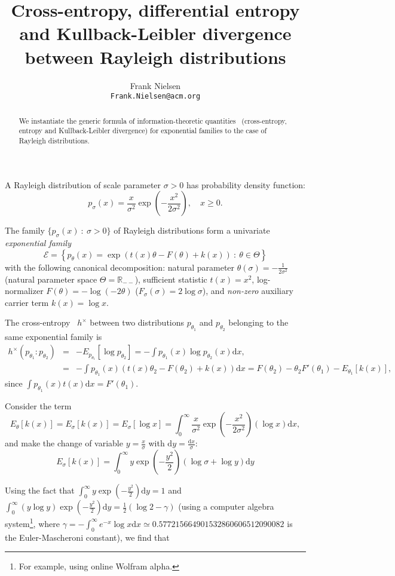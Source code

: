 \documentclass{article}
\title{Cross-entropy, differential entropy and Kullback-Leibler divergence between Rayleigh distributions}
\author{Frank Nielsen\\ {\tt Frank.Nielsen@acm.org}}
\date{}
\def\st{\ :\ }
\def\dx{\mathrm{d}x}
\def\dy{\mathrm{d}y}
\def\bbR{{\mathbb{R}}}
\begin{document}
\maketitle

\begin{abstract}
We instantiate the generic formula of information-theoretic quantities~\cite{EF-2010} (cross-entropy, entropy and Kullback-Leibler divergence) for exponential families to the case of Rayleigh distributions.
\end{abstract}

A Rayleigh distribution of scale parameter $\sigma>0$ has probability density function:
$$
p_\sigma(x) = \frac{x}{\sigma^2} \exp \left( -\frac{x^2}{2\sigma^2} \right), \quad x\geq 0.
$$

The family  $\{p_\sigma(x) \st \sigma>0\}$ of Rayleigh distributions form a univariate {\em exponential family}~\cite{EF-2009} 
$$
\mathcal{E}=\left\{p_\theta(x)= \exp(t(x)\theta-F(\theta)+k(x)) \st \theta\in\Theta\right\}
$$
with the following canonical decomposition:
natural parameter $\theta(\sigma)=-\frac{1}{2\sigma^2}$  (natural parameter space $\Theta=\bbR_{--}$),  sufficient statistic $t(x)=x^2$,
 log-normalizer $F(\theta)=- \log (-2 \theta)$ ($F_\sigma(\sigma)=2\log\sigma$),  and {\em non-zero} auxiliary carrier term $k(x)=\log x$.


The cross-entropy~\cite{EF-2010,CT-2012} $h^\times$ between two distributions $p_{\theta_1}$ and $p_{\theta_2}$ belonging to the same exponential family is
\begin{eqnarray}
h^\times(p_{\theta_1}:p_{\theta_2}) &=& -E_{p_{\theta_1}}[\log p_{\theta_2}] = -\int p_{\theta_1}(x)\log p_{\theta_2}(x) \dx,\\
&=&  -\int p_{\theta_1}(x) (t(x)\theta_2-F(\theta_2)+k(x))\dx
 = F(\theta_2)-\theta_2 F'(\theta_1)-E_{{\theta_1}}[k(x)],
\end{eqnarray}
since $\int p_{\theta_1}(x) t(x)\dx=F'(\theta_1)$.

Consider the term 
$$
E_\theta[k(x)]=E_\sigma[k(x)]=E_\sigma[\log x]= \int_0^\infty \frac{x}{\sigma^2} \exp\left(-\frac{x^2}{2\sigma^2}\right) (\log x) \dx,
$$
and make the change of variable $y=\frac{x}{\sigma}$ with $\dy=\frac{\dx}{\sigma}$:
$$
E_\sigma[k(x)]=  \int_0^\infty   y  \exp\left(-\frac{y^2}{2}\right) (\log \sigma+\log y)   \dy
$$

Using the fact that $\int_0^\infty   y  \exp(-\frac{y^2}{2}) \dy =1$ 
and $\int_0^\infty   (y \log y) \exp(-\frac{y^2}{2}) \dy = \frac{1}{2} (\log 2-\gamma)$ (using a computer algebra system\footnote{For example, using online Wolfram alpha.}, where $\gamma=-\int_0^\infty e^{-x}\log x \dx \simeq 0.577215664901532860606512090082$ is the {Euler-Mascheroni constant}), we find that
\end{document}
